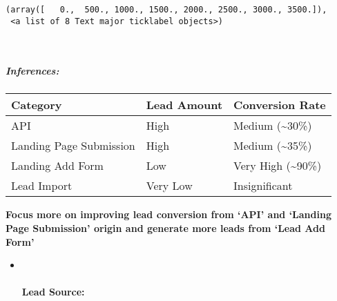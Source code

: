 \documentclass[11pt]{article}
\makeatletter
\newcommand{\boxspacing}{\kern\kvtcb@left@rule\kern\kvtcb@boxsep}
\newcommand{\prompt}[4]{
        \ttfamily\llap{{\color{#2}[#3]:\hspace{3pt}#4}}\vspace{-\baselineskip}
    }
\makeatother
\begin{document}
            \begin{tcolorbox}[breakable, size=fbox, boxrule=.5pt, pad at break*=1mm, opacityfill=0]
\prompt{Out}{outcolor}{30}{\boxspacing}
\begin{Verbatim}[commandchars=\\\{\}]
(array([   0.,  500., 1000., 1500., 2000., 2500., 3000., 3500.]),
 <a list of 8 Text major ticklabel objects>)
\end{Verbatim}
\end{tcolorbox}
        
    \begin{center}
    \end{center}
    { \hspace*{\fill} \\}
    
    \hypertarget{inferences}{%
\subparagraph{Inferences:}\label{inferences}}

\begin{longtable}[]{@{}lll@{}}
\toprule
Category & Lead Amount & Conversion Rate\tabularnewline
\midrule
\endhead
API & High & Medium (\textasciitilde{}30\%)\tabularnewline
Landing Page Submission & High & Medium
(\textasciitilde{}35\%)\tabularnewline
Landing Add Form & Low & Very High
(\textasciitilde{}90\%)\tabularnewline
Lead Import & Very Low & Insignificant\tabularnewline
\bottomrule
\end{longtable}

\textbf{Focus more on improving lead conversion from `API' and `Landing
Page Submission' origin and generate more leads from `Lead Add Form'}

    \begin{itemize}
\item ~
  \hypertarget{lead-source}{%
  \paragraph{ Lead Source:}\label{lead-source}}
\end{itemize}
\end{document}
